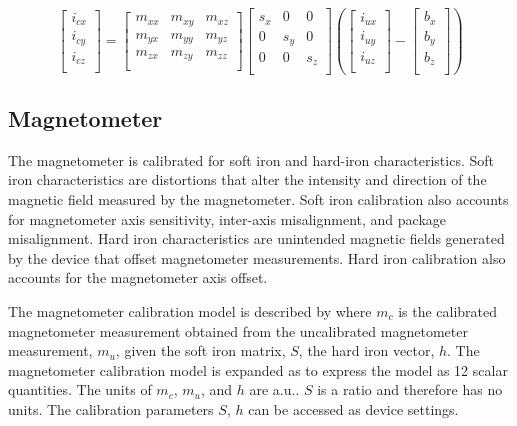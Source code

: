 \begin{equation}
\label{eq:inertialExpanded}
    \begin{bmatrix}
        i_{cx}\\
        i_{cy}\\
        i_{cz}\\
    \end{bmatrix}
    =
    \begin{bmatrix}
        m_{xx} & m_{xy} & m_{xz}\\
        m_{yx} & m_{yy} & m_{yz}\\
        m_{zx} & m_{zy} & m_{zz}\\
    \end{bmatrix}
    \begin{bmatrix}
        s_{x} & 0 & 0\\
        0 & s_{y} & 0\\
        0 & 0 & s_{z}\\
    \end{bmatrix}
    \left(
    \begin{bmatrix}
        i_{ux}\\
        i_{uy}\\
        i_{uz}\\
    \end{bmatrix}
    -
    \begin{bmatrix}
        b_{x}\\
        b_{y}\\
        b_{z}\\
    \end{bmatrix}
    \right)
\end{equation}

\subsection{Magnetometer}
\label{sec:magnetometer}

The magnetometer is calibrated for soft iron and hard-iron characteristics.  Soft iron characteristics are distortions that alter the intensity and direction of the magnetic field measured by the magnetometer.  Soft iron calibration also accounts for magnetometer axis sensitivity, inter-axis misalignment, and package misalignment.  Hard iron characteristics are unintended magnetic fields generated by the device that offset magnetometer measurements.  Hard iron calibration also accounts for the magnetometer axis offset.

The magnetometer calibration model is described by  where $m_c$ is the calibrated magnetometer measurement obtained from the uncalibrated magnetometer measurement, $m_u$, given the soft iron matrix, $S$, the hard iron vector, $h$.  The magnetometer calibration model is expanded as  to express the model as 12 scalar quantities.  The units of $m_c$, $m_u$, and $h$ are \ac{a.u.}.  $S$ is a ratio and therefore has no units.  The calibration parameters $S$, $h$ can be accessed as device settings.

